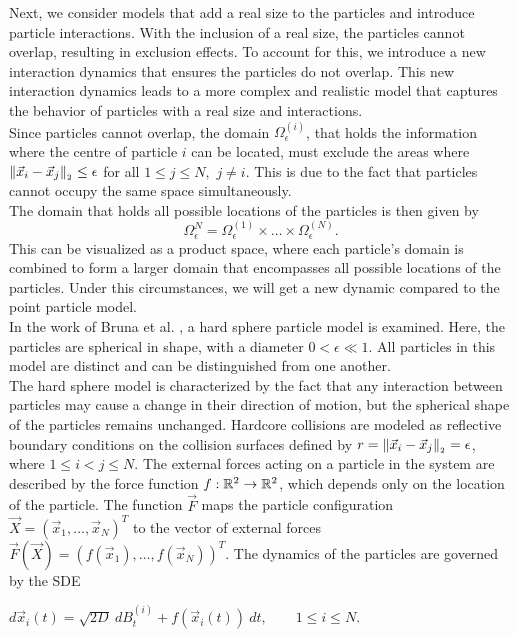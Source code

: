 Next, we consider models that add a real size to the particles and introduce particle interactions. 
With the inclusion of a real size, the particles cannot overlap, resulting in exclusion effects. 
To account for this, we introduce a new interaction dynamics that ensures the particles do not overlap. 
This new interaction dynamics leads to a more complex and realistic model that captures the behavior of particles with a real size and interactions. \\
Since particles cannot overlap, the domain $\Omega^{(i)}_{\epsilon}$, that holds the information where the centre of particle $i$ can be located, must exclude the areas where $\norm[\vec{x}_i - \vec{x}_j] \leq \epsilon$ for all $1 \leq j \leq N,$ $j \neq i$. 
This is due to the fact that particles cannot occupy the same space simultaneously. \\
The domain that holds all possible locations of the particles is then given by \[\Omega^N_{\epsilon} = \Omega^{(1)}_{\epsilon} \times \ldots \times \Omega^{(N)}_{\epsilon} .\] 
This can be visualized as a product space, where each particle's domain is combined to form a larger domain that encompasses all possible locations of the particles.
Under this circumstances, we will get a new dynamic compared to the point particle model.  \\
In the work of Bruna et al. \cite{Bruna2012}, a hard sphere particle model is examined.
Here, the particles are spherical in shape, with a diameter $0 < \epsilon \ll 1$.
All particles in this model are distinct and can be distinguished from one another. \\
The hard sphere model is characterized by the fact that any interaction between particles may cause a change in their direction of motion, but the spherical shape of the particles remains unchanged.
Hardcore collisions are modeled as reflective boundary conditions on the collision surfaces defined by $r = \norm[\vec{x}_i - \vec{x}_j] = \epsilon$, where $1 \leq i < j \leq N$.
The external forces acting on a particle in the system are described by the force function $f: \mathbb{R}^2 \rightarrow \mathbb{R}^2$, which depends only on the location of the particle.
The function $\vec{F}$ maps the particle configuration $\vec{X} = (\vec{x}_1, \ldots, \vec{x}_N)^T$ to the vector of external forces $\vec{F}(\vec{X}) = (f(\vec{x}_1), \ldots, f(\vec{x}_N))^T$.
The dynamics of the particles are governed by the SDE
\begin{center}
	$d\vec{x}_i(t) = \sqrt{2D} \: dB_t^{(i)} + f(\vec{x}_i(t)) \: dt, \qquad 1 \leq i \leq N$.
\end{center}
